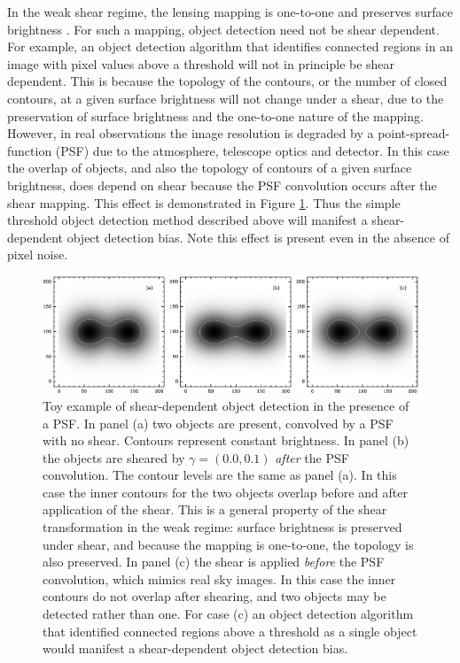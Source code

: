 \documentclass[iop, appendixfloats, numberedappendix, apj]{emulateapj}
\begin{document}
In the weak shear regime, the lensing mapping is one-to-one and preserves
surface brightness \citep{SchneiderBook92}. For such a mapping, object
detection need not be shear dependent. For example, an object detection
algorithm that identifies connected regions in an image with pixel values above
a threshold will not in principle be shear dependent.  This is because the
topology of the contours, or the number of closed contours, at a given surface
brightness will not change under a shear, due to the preservation of surface
brightness and the one-to-one nature of the mapping.  However, in real
observations the image resolution is degraded by a point-spread-function (PSF)
due to the atmosphere, telescope optics and detector. In this case the overlap
of objects, and also the topology of contours of a given surface brightness,
does depend on shear because the PSF convolution occurs after the shear
mapping.  This effect is demonstrated in Figure \ref{fig:toy}.  Thus the simple
threshold object detection method described above will manifest a
shear-dependent object detection bias. Note this effect is present even in the
absence of pixel noise.

\begin{figure}
    \begin{center}
        \includegraphics[width=\textwidth]{figures/toy.png}

        \caption{ Toy example of shear-dependent object detection in the presence of
        a PSF.  In panel (a) two objects are present, convolved by a PSF with no
        shear.  Contours represent constant brightness.  In panel (b) the objects
        are sheared by $\gamma = (0.0, 0.1)$ {\em after} the PSF convolution.  The
        contour levels are the same as panel (a).  In this case the inner contours
        for the two objects overlap before and after application of the shear. This
        is a general property of the shear transformation in the weak regime:
        surface brightness is preserved under shear, and because the mapping is
        one-to-one, the topology is also preserved. In panel (c) the shear is
        applied {\em before} the PSF convolution, which mimics real sky images. In
        this case the inner contours do not overlap after shearing, and two objects
        may be detected rather than one.  For case (c) an object detection
        algorithm that identified connected regions above a threshold as a single
        object would manifest a shear-dependent object detection bias.
        \label{fig:toy} }
    \end{center}

\end{figure}
\end{document}
